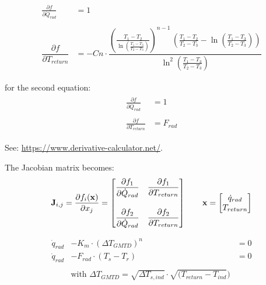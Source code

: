 \begin{equation}
	\begin{aligned}
		\begin{matrix}
			\frac{\partial f}{\partial \dot{Q}_{rad}} &= 1 \\ 
			\\
			\dfrac{\partial f}{\partial T_{return}} &= -Cn\cdot \dfrac{\left(\frac{T_1-T_2}{\ln\left(\frac{T_1-T_3}{T_2-T_3}\right)}\right)^{n-1}\,\left(\frac{T_1-T_2}{T_2-T_3}-\ln\left(\frac{T_1-T_3}{T_2-T_3}\right)\right)}{\ln^2\left(\frac{T_1-T_3}{T_2-T_3}\right)} \\ \\
		\end{matrix}
	\end{aligned}
\end{equation} 
for the second equation:
\begin{equation}
	\begin{aligned}
		\begin{matrix}
			\frac{\partial f}{\partial \dot{Q}_{rad}} &= 1 \\ \\
			\frac{\partial f}{\partial T_{return}} &= F_{rad}
		\end{matrix}
	\end{aligned}
\end{equation} 

See: \url{https://www.derivative-calculator.net/}.

The Jacobian matrix becomes:
\begin{equation}
	\begin{aligned}
		\mathbf{J}_{i,j}=\dfrac{\partial f_{i}(\mathbf{x})}{\partial x_{j}} =
		\begin{bmatrix}
			\dfrac{\partial f_1}{\partial \dot{Q}_{rad}} & \dfrac{\partial f_1}{\partial T_{return}} \\ 
			\vspace{2pt} \\
			\dfrac{\partial f_2}{\partial \dot{Q}_{rad}} & \dfrac{\partial f_2}{\partial T_{return}}
		\end{bmatrix}
		\qquad
		\mathbf{x} =
		\begin{bmatrix}
			\dot{q}_{rad} \\ 
			T_{return}
		\end{bmatrix}
	\end{aligned}
\end{equation} 

{\color{blue}
	\begin{equation}
		\label{eq:radgmtd}
		\begin{aligned}
			\dot{q}_{rad} &- K_m \cdot (\Delta T_{GMTD})^n &= 0 \\
			\dot{q}_{rad} &- F_{rad} \cdot (T_{s} - T_{r}) &= 0 \\ \\
			&\text{with } \Delta T_{GMTD} = \sqrt{\Delta T_{s,ind}} \cdot  \sqrt{(T_{return} - T_{ind}})
		\end{aligned}
	\end{equation}
}

